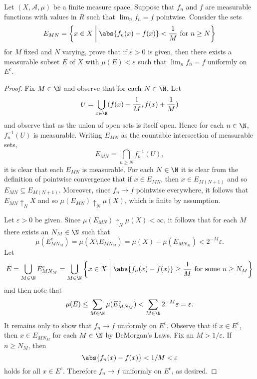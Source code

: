 \documentclass[12pt]{amsart}
\begin{document}
\begin{thm}
  Let $(X, \mathcal{A}, \mu)$ be a finite measure space.
  Suppose that $f_n$ and $f$ are measurable functions with values in $R$ such that $\lim_n f_n = f$ pointwise.
  Consider the sets
  $$E_{MN} = \left\{x \in X \;\middle\vert\; \abs{f_n(x) - f(x)} < \frac{1}{M}\ \text{for}\ n \geq N\right\}$$
  for $M$ fixed and $N$ varying, prove that if $\varepsilon > 0$ is given, then there exists a measurable subset $E$ of $X$ with $\mu(E) < \varepsilon$ such that $\lim_n f_n = f$ uniformly on $E^c$.
  \begin{proof}
    Fix $M \in \N$ and observe that for each $N \in \N$.
    Let $$U = \bigcup_{x \in \R} (f(x) - \frac{1}{M}, f(x) + \frac{1}{M})$$
    and observe that as the union of open sets is itself open.
    Hence for each $n \in \N$, $f_n^{-1}(U)$ is measurable.
    Writing $E_{MN}$ as the countable intersection of measurable sets,
    $$E_{MN} = \bigcap_{n \geq N} f_n^{-1}(U),$$
    it is clear that each $E_{MN}$ is measurable.
    For each $N \in \N$ it is clear from the definition of pointwise convergence that if $x \in E_{MN}$, then $x \in E_{M(N+1)}$ and so $E_{MN} \subseteq E_{M(N+1)}$.
    Moreover, since $f_n \rightarrow f$ pointwise everywhere, it follows that $E_{MN} \uparrow_N X$ and so $\mu(E_{MN}) \uparrow_N \mu(X)$, which is finite by assumption.
    
    Let $\varepsilon > 0$ be given.
    Since $\mu(E_{MN}) \uparrow_N \mu(X) < \infty$, it follows that for each $M$ there exists an $N_M \in \N$ such that 
    $$\mu(E_{MN_M}^c) = \mu(X \setminus E_{MN_M}) = \mu(X) - \mu(E_{MN_M}) < 2^{-M}\varepsilon.$$
    Let 
    $$E = \bigcup_{M \in \N} E_{MN_M}^c = \bigcup_{M \in \N} \left\{x \in X \;\middle\vert\; \abs{f_n(x) - f(x)} \geq \frac{1}{M}\ \text{for some}\ n \geq N_M \right\}$$
    and then note that
    $$\mu(E) \leq \sum_{M \in \N} \mu(E_{MN_M}^c) < \sum_{M \in \N} 2^{-M}\varepsilon = \varepsilon.$$
    It remains only to show that $f_n \rightarrow f$ uniformly on $E^c$.
    Observe that if $x \in E^c$, then $x \in E_{MN_M}$ for each $M \in \N$ by DeMorgan's Laws.
    Fix an $M > 1/\varepsilon$.
    If $n \geq N_M$, then
    $$\abs{f_n(x) - f(x)} < 1/M < \varepsilon$$
    holds for all $x \in E^c$.
    Therefore $f_n \rightarrow f$ uniformly on $E^\text{c}$, as desired.
  \end{proof}
\end{thm}
\newpage
  
\end{document}
